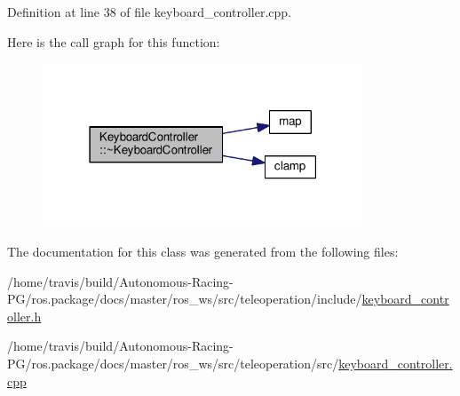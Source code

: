 Definition at line 38 of file keyboard\+\_\+controller.\+cpp.



Here is the call graph for this function\+:
\nopagebreak
\begin{figure}[H]
\begin{center}
\leavevmode
\includegraphics[width=271pt]{class_keyboard_controller_a9791aa6d6fadf77b4ef3e59cdb7d9b1d_cgraph}
\end{center}
\end{figure}




The documentation for this class was generated from the following files\+:\begin{DoxyCompactItemize}
\item 
/home/travis/build/\+Autonomous-\/\+Racing-\/\+P\+G/ros.\+package/docs/master/ros\+\_\+ws/src/teleoperation/include/\hyperlink{keyboard__controller_8h}{keyboard\+\_\+controller.\+h}\item 
/home/travis/build/\+Autonomous-\/\+Racing-\/\+P\+G/ros.\+package/docs/master/ros\+\_\+ws/src/teleoperation/src/\hyperlink{keyboard__controller_8cpp}{keyboard\+\_\+controller.\+cpp}\end{DoxyCompactItemize}
